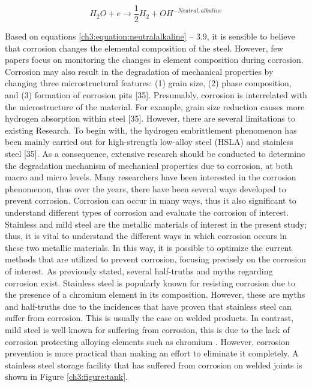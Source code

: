 \documentclass[12pt]{report}
\begin{document}
\begin{equation}
    H_2O + e \rightarrow \frac{1}{2}H_2 + OH^{-Neutral,alkaline}
    \label{ch3:equation:neutralalkaline}
\end{equation}

Based on equations \ref{ch3:equation:neutralalkaline} – 3.9, it is sensible to believe that corrosion changes the elemental composition of the steel. However, few papers focus on monitoring the changes in element composition during corrosion. Corrosion may also result in the degradation of mechanical properties by changing three microstructural features: (1) grain size, (2) phase composition, and (3) formation of corrosion pits [35]. Presumably, corrosion is interrelated with the microstructure of the material. For example, grain size reduction causes more hydrogen absorption within steel [35]. However, there are several limitations to existing Research. To begin with, the hydrogen embrittlement phenomenon has been mainly carried out for high-strength low-alloy steel (HSLA) and stainless steel [35]. As a consequence, extensive research should be conducted to determine the degradation mechanism of mechanical properties due to corrosion, at both macro and micro levels.  
Many researchers have been interested in the corrosion phenomenon, thus over the years, there have been several ways developed to prevent corrosion. Corrosion can occur in many ways, thus it also significant to understand different types of corrosion and evaluate the corrosion of interest. Stainless and mild steel are the metallic materials of interest in the present study; thus, it is vital to understand the different ways in which corrosion occurs in these two metallic materials. In this way, it is possible to optimize the current methods that are utilized to prevent corrosion, focusing precisely on the corrosion of interest.
As previously stated, several half-truths and myths regarding corrosion exist. Stainless steel is popularly known for resisting corrosion due to the presence of a chromium element in its composition. However, these are myths and half-truths due to the incidences that have proven that stainless steel can suffer from corrosion. This is usually the case on welded products. In contrast, mild steel is well known for suffering from corrosion, this is due to the lack of corrosion protecting alloying elements such as chromium \cite{hackerman1987theory}. However, corrosion prevention is more practical than making an effort to eliminate it completely. A stainless steel storage facility that has suffered from corrosion on welded joints is shown in Figure \ref{ch3:figure:tank}.
 
\end{document}
